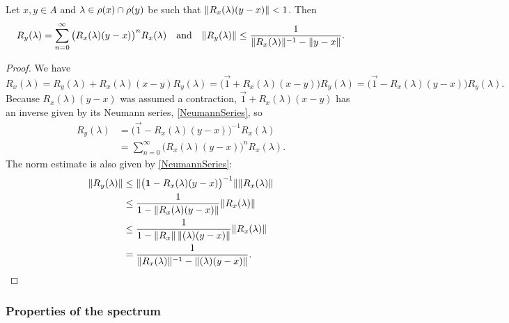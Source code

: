 \begin{corollary}
Let $x,y\in A$ and $\lambda\in \rho(x)\cap \rho(y)$ be such that $\lVert R_x(\lambda)(y-x)\rVert<1$. Then 
\[ R_y(\lambda) = \sum_{n=0}^\infty \big(R_x(\lambda)(y-x)\big)^nR_x(\lambda) \quad\text{and}\quad \lVert R_y(\lambda)\rVert \leq \frac{1}{\lVert R_x(\lambda)\rVert^{-1} - \lVert y-x\rVert}. \]
\end{corollary}
\begin{proof}
We have
\[ R_x(\lambda) = R_y(\lambda) + R_x(\lambda)(x-y)R_y(\lambda) = \big(\vec{1} + R_x(\lambda)(x-y)\big)R_y(\lambda) = \big(\vec{1} - R_x(\lambda)(y-x)\big)R_y(\lambda). \]
Because $R_x(\lambda)(y-x)$ was assumed a contraction, $\vec{1} + R_x(\lambda)(x-y)$ has an inverse given by its Neumann series, \ref{NeumannSeries}, so
\begin{align*}
R_y(\lambda) &= \big(\vec{1} - R_x(\lambda)(y-x)\big)^{-1} R_x(\lambda) \\
&= \sum_{n=0}^\infty \big(R_x(\lambda)(y-x)\big)^n R_x(\lambda).
\end{align*}
The norm estimate is also given by \ref{NeumannSeries}:
\begin{align*}
\lVert R_y(\lambda)\rVert &\leq \lVert\big(\boldsymbol{\mathrm{1}} - R_x(\lambda)(y-x)\big)^{-1}\rVert\lVert R_x(\lambda)\rVert \\
&\leq \frac{1}{1 - \lVert R_x(\lambda)(y-x)\rVert}\lVert R_x(\lambda)\rVert \\
&\leq \frac{1}{1 - \lVert R_x\rVert\,\lVert(\lambda)(y-x)\rVert}\lVert R_x(\lambda)\rVert \\
&= \frac{1}{\lVert R_x(\lambda)\rVert^{-1} - \lVert(\lambda)(y-x)\rVert}.
\end{align*}
\end{proof}

\subsubsection{Properties of the spectrum}

